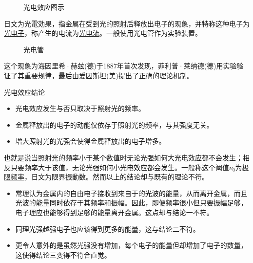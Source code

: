 \begin{figure}[ht!]
    \centering
    \caption{光电效应图示}
\end{figure}
日文为光電効果，指金属在受到光的照射后释放出电子的现象，并特称这种电子为\underline{光电子}，称产生的电流为\underline{光电流}。一般使用光电管作为实验装置。
\begin{figure}[ht!]
    \centering
    \caption{光电管}
\end{figure}
这个现象为海因里希·赫兹(德)于1887年首次发现，菲利普·莱纳德(德)用实验验证了其重要规律，最后由爱因斯坦(美)提出了正确的理论机制。
\begin{itembox}[l]{光电效应结论}
    \begin{itemize}
        \item 光电效应发生与否只取决于照射光的频率。
        \item 金属释放出的电子的动能仅依存于照射光的频率，与其强度无关。
        \item 增大照射光的光强会使得金属释放出的电子增多。
    \end{itemize}
\end{itembox}
也就是说当照射光的频率小于某个数值时无论光强如何大光电效应都不会发生；相反只要频率大于该值，无论光强如何小光电效应都会发生。一般称这个阈值$\nu_0$为\underline{极限频率}，日文为限界振動数。然而以上的结论却与既有的理论不符。
\begin{itemize}
    \item 常理认为金属内的自由电子接收到来自于的光波的能量，从而离开金属，而且光波的能量同时依存于其频率和振幅。因此，即便频率很小但只要振幅足够，电子理应也能够得到足够的能量离开金属。这点却与结论一不符。
    \item 同理光强越强电子也应该得到更多的能量，这与结论二不符。
    \item 更令人意外的是虽然光强没有增加，每个电子的能量但却增加了电子的数量，这使得结论三变得不符合直觉。
\end{itemize}


